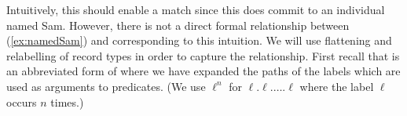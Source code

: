 Intuitively, this should enable a match since this does commit to an
individual named Sam.  However, there is not a direct formal
relationship between (\ref{ex:namedSam}) and \preveg{} corresponding
to this intuition. We will use flattening and relabelling of record
types in order to capture the relationship.  First recall that
\preveg{} is an abbreviated form of \nexteg{} where we have expanded
the paths of the labels which are used as arguments to predicates.  (We
use $\ell^n$ for $\ell.\ell.\ldots.\ell$ where the label $\ell$ occurs $n$ times.) 
\begin{ex} 
\label{ex:nonflatsharedcomms} 
\end{ex}
